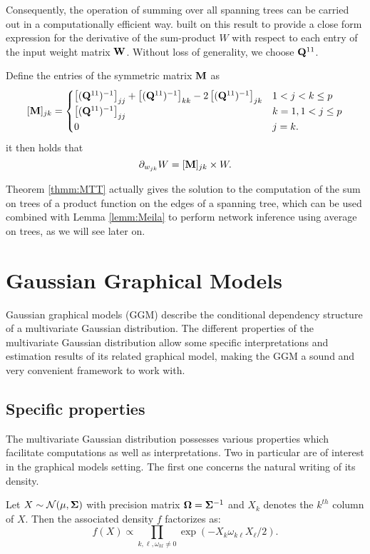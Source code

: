 Consequently, the operation of summing over all spanning trees can be carried out in a computationally efficient way. \cite{MeilaJaak}  built on this result to provide a close form expression for the derivative of the sum-product $W$ with respect to each entry of the input weight matrix ${\bf W}$.   Without loss of generality, we choose ${\bf Q}^{11}$.

\begin{lemma}  \label{lemm:Meila}
    Define the entries of the symmetric matrix ${\bf M}$ as
\[    
 [{\bf M}]_{jk} =\begin{cases}
    \left[({\bf Q}^{11})^{-1}\right]_{jj} + \left[({\bf Q}^{11})^{-1}\right]_{kk} -2\left[({\bf Q}^{11})^{-1}\right]_{jk} & 1< j<k \leq p\\
    \left[({\bf Q}^{11})^{-1}\right]_{jj} & k=1, 1< j \leq p  \\
    0 &  j=k .
    \end{cases}
\] 
it then holds that
$$\partial_{w_{jk}} W = [{\bf M}]_{jk}  \times W.$$
\end{lemma}

Theorem \ref{thmm:MTT} actually gives the solution to the computation of the sum on trees of a product function on the edges of a spanning tree, which can be used combined with  Lemma \ref{lemm:Meila} to perform network inference using average on trees, as we will see later on. 

 \section{Gaussian Graphical Models}
 Gaussian graphical models (GGM) describe the conditional dependency structure of a  multivariate Gaussian distribution. The different properties of the multivariate Gaussian distribution allow some specific interpretations and estimation results of its related graphical model,  making the GGM a sound and very convenient  framework to work with.
 
 \subsection{Specific properties} \label{ggm:prop}
The multivariate Gaussian distribution possesses various properties which facilitate computations as well as interpretations. Two in particular are of interest in the graphical models setting. The first one concerns the natural writing of its density.
 \begin{prop}\label{pp:ggm1}
 Let $X\sim \mathcal{N}(\mu, {\boldsymbol{\Sigma}})$ with precision matrix ${\boldsymbol{\Omega}}={\boldsymbol{\Sigma}}^{-1}$ and $X_k$ denotes the $k^{th}$ column of $X$. Then the associated density $f$ factorizes as:
 $$f(X) \propto \prod_{k,\ell, \omega_{kl}\neq 0} \exp(-X_{k}\omega_{k\ell}X_{\ell}/2).$$
 \end{prop}
 
